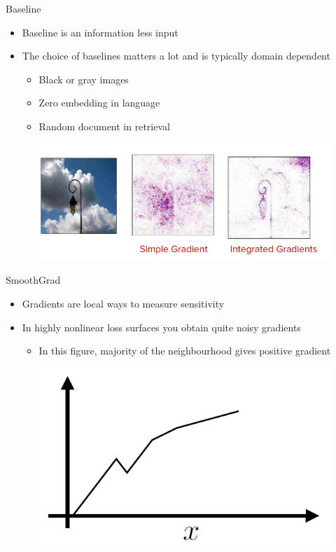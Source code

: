 \documentclass[11pt,compress,t,notes=noshow, aspectratio=169, xcolor=table]{beamer}
\begin{document}
\begin{frame}{Baseline}
    \begin{itemize}
        \item Baseline is an information less input
        \item The choice of baselines matters a lot and is typically domain dependent
        \begin{itemize}
            \item Black or gray images
            \item Zero embedding in language
            \item Random document in retrieval
        \end{itemize}
    \end{itemize}
    \begin{figure}
        \centering
        \includegraphics[scale=.5]{bild25}
    \end{figure}
\end{frame}

\begin{frame}{SmoothGrad}
    \begin{itemize}
        \item Gradients are local ways to measure sensitivity
        \item In highly nonlinear loss surfaces you obtain quite noisy gradients
        \begin{itemize}
            \item In this figure, majority of the neighbourhood gives positive gradient
        \end{itemize}
    \end{itemize}
    \begin{figure}
        \centering
        \includegraphics[width=0.6\linewidth]{bild26}
    \end{figure}
\end{frame}
\end{document}
